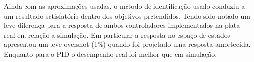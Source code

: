 \documentclass[a4paper,11pt]{article}
\begin{document}
Ainda com as aproximações usadas, o método de identificação usado conduziu a um resultado satisfatório dentro dos objetivos pretendidos. Tendo sido notado um leve diferença para a resposta de ambos controladores implementados na plata real em relação a simulação. Em particular a resposta no espaço de estados apresentou um leve overshot (1\%) quando foi projetado uma resposta amortecida. Enquanto para o PID o desempenho real foi melhor que em simulação.





\nocite{ogata2010modern}

\end{document}
